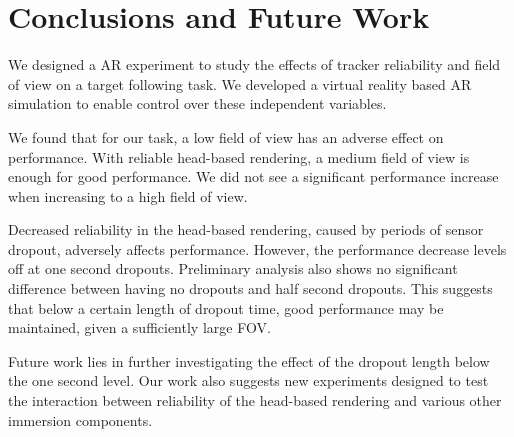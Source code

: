 \documentclass{acmsiggraph}                     %
\begin{document}

\section{Conclusions and Future Work}

We designed a AR experiment to study the effects of tracker reliability and field of view on a target following task.  We developed a virtual reality based AR simulation to enable control over these independent variables.

We found that for our task, a low field of view has an adverse effect on performance.  
With reliable head-based rendering, a medium field of view is enough for good performance.  We did not see a significant performance increase when increasing to a high field of view.

Decreased reliability in the head-based rendering, caused by periods of sensor dropout, adversely affects performance.  However, the performance decrease levels off at one second dropouts.  Preliminary analysis also shows no significant difference between having no dropouts and half second dropouts.  This suggests that below a certain length of dropout time, good performance may be maintained, given a sufficiently large FOV.%

Future work lies in further investigating the effect of the dropout length 
below the one second level.  Our work also suggests new experiments designed to test the interaction between reliability of the head-based rendering and various other immersion components.




\end{document}
